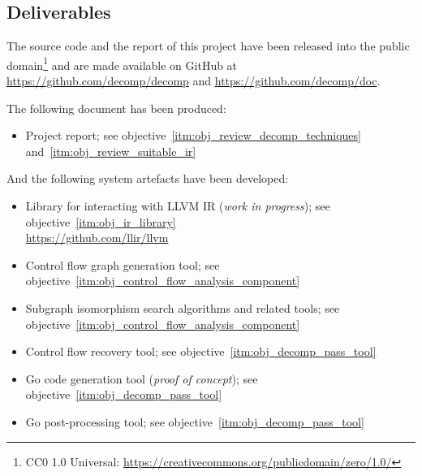 
\subsection{Deliverables}
\label{sec:intro_deliverables}

The source code and the report of this project have been released into the public domain\footnote{CC0 1.0 Universal: \url{https://creativecommons.org/publicdomain/zero/1.0/}} and are made available on GitHub at \url{https://github.com/decomp/decomp} and \url{https://github.com/decomp/doc}.

The following document has been produced:

\begin{itemize}
	\item Project report; see objective~\ref{itm:obj_review_decomp_techniques} and~\ref{itm:obj_review_suitable_ir}
\end{itemize}

And the following system artefacts have been developed:

\begin{itemize}
	\item Library for interacting with LLVM IR (\textit{work in progress}); see objective~\ref{itm:obj_ir_library} \\ \url{https://github.com/llir/llvm}
	\item Control flow graph generation tool; see objective~\ref{itm:obj_control_flow_analysis_component}
	\item Subgraph isomorphism search algorithms and related tools; see objective~\ref{itm:obj_control_flow_analysis_component}
	\item Control flow recovery tool; see objective~\ref{itm:obj_decomp_pass_tool}
	\item Go code generation tool (\textit{proof of concept}); see objective~\ref{itm:obj_decomp_pass_tool}
	\item Go post-processing tool; see objective~\ref{itm:obj_decomp_pass_tool}
\end{itemize}
